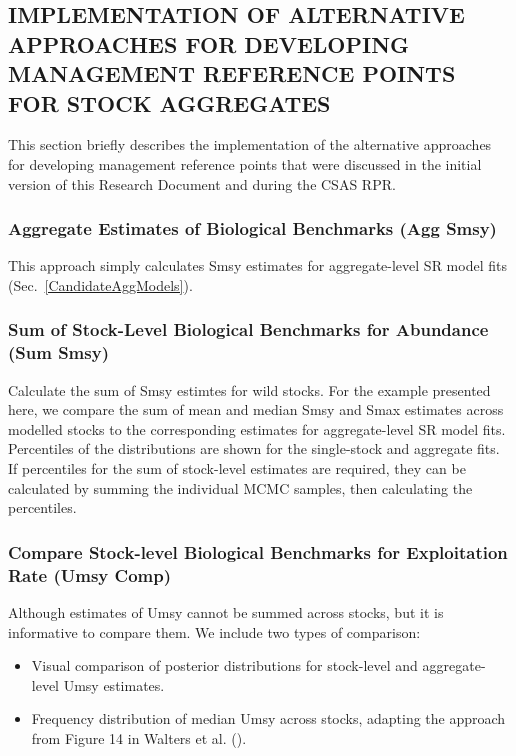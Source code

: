 \documentclass[french,11pt]{book}
\begin{document}
\endgroup{} \endgroup{}

\clearpage

\subsection{IMPLEMENTATION OF ALTERNATIVE APPROACHES FOR DEVELOPING MANAGEMENT REFERENCE POINTS FOR STOCK AGGREGATES}\label{AltApproachesMethods}

This section briefly describes the implementation of the alternative approaches for developing management reference points that were discussed in the initial version of this Research Document and during the CSAS RPR.

\subsubsection{Aggregate Estimates of Biological Benchmarks (Agg Smsy)}\label{aggregate-estimates-of-biological-benchmarks-agg-smsy}

This approach simply calculates Smsy estimates for aggregate-level SR model fits (Sec.~\ref{CandidateAggModels}).

\subsubsection{Sum of Stock-Level Biological Benchmarks for Abundance (Sum Smsy)}\label{sum-of-stock-level-biological-benchmarks-for-abundance-sum-smsy}

Calculate the sum of Smsy estimtes for wild stocks. For the example presented here, we compare the sum of mean and median Smsy and Smax estimates across modelled stocks to the corresponding estimates for aggregate-level SR model fits. Percentiles of the distributions are shown for the single-stock and aggregate fits. If percentiles for the sum of stock-level estimates are required, they can be calculated by summing the individual MCMC samples, then calculating the percentiles.

\subsubsection{Compare Stock-level Biological Benchmarks for Exploitation Rate (Umsy Comp)}\label{compare-stock-level-biological-benchmarks-for-exploitation-rate-umsy-comp}

Although estimates of Umsy cannot be summed across stocks, but it is informative to compare them. We include two types of comparison:
\begin{itemize}

\item
  Visual comparison of posterior distributions for stock-level and aggregate-level Umsy estimates.
\item
  Frequency distribution of median Umsy across stocks, adapting the approach from Figure 14 in Walters et al. ().
\end{itemize}
\end{document}
